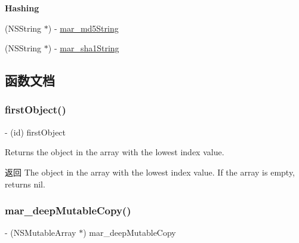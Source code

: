 \begin{Indent}\textbf{ Hashing}\par
{\em 

 

 }\begin{DoxyCompactItemize}
\item 
(N\+S\+String $\ast$) -\/ \hyperlink{category_n_s_array_07_m_a_r_e_x_08_abae762adf6698d51e984c8e2e2229a9f}{mar\+\_\+md5\+String}
\item 
(N\+S\+String $\ast$) -\/ \hyperlink{category_n_s_array_07_m_a_r_e_x_08_a9e145349ba83bc7ba5630b34c5045987}{mar\+\_\+sha1\+String}
\end{DoxyCompactItemize}
\end{Indent}


\subsection{函数文档}
\mbox{\label{category_n_s_array_07_m_a_r_e_x_08_a9bf191f60966aeec54edc1dcdbc9ea29}} 
\subsubsection{\texorpdfstring{first\+Object()}{firstObject()}}
{\footnotesize\ttfamily -\/ (id) first\+Object \begin{DoxyParamCaption}{ }\end{DoxyParamCaption}}

Returns the object in the array with the lowest index value.

\begin{DoxyReturn}{返回}
The object in the array with the lowest index value. If the array is empty, returns {\ttfamily nil}. 
\end{DoxyReturn}
\mbox{\label{category_n_s_array_07_m_a_r_e_x_08_a74f7e480b65a7ecdb44606c1fcc83158}} 
\subsubsection{\texorpdfstring{mar\+\_\+deep\+Mutable\+Copy()}{mar\_deepMutableCopy()}}
{\footnotesize\ttfamily -\/ (N\+S\+Mutable\+Array $\ast$) mar\+\_\+deep\+Mutable\+Copy \begin{DoxyParamCaption}{ }\end{DoxyParamCaption}\hspace{0.3cm}{\ttfamily [implementation]}}


